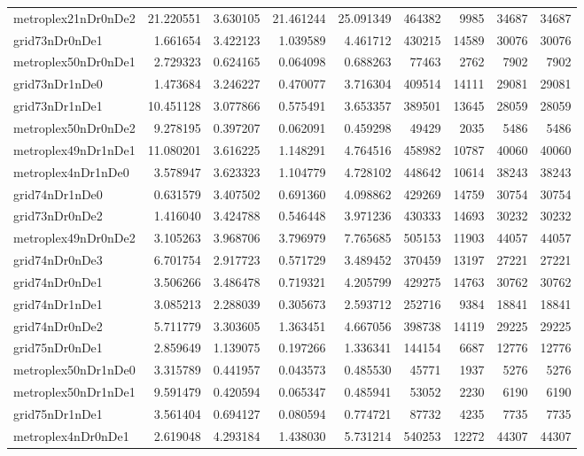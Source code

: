 \begin{longtable}{|l|r|r|r|r|r|r|r|r|}
metroplex21nDr0nDe2 & 21.220551 & 3.630105 & 21.461244 & 25.091349 & 464382 & 9985 & 34687 & 34687 \\
grid73nDr0nDe1 & 1.661654 & 3.422123 & 1.039589 & 4.461712 & 430215 & 14589 & 30076 & 30076 \\
metroplex50nDr0nDe1 & 2.729323 & 0.624165 & 0.064098 & 0.688263 & 77463 & 2762 & 7902 & 7902 \\
grid73nDr1nDe0 & 1.473684 & 3.246227 & 0.470077 & 3.716304 & 409514 & 14111 & 29081 & 29081 \\
grid73nDr1nDe1 & 10.451128 & 3.077866 & 0.575491 & 3.653357 & 389501 & 13645 & 28059 & 28059 \\
metroplex50nDr0nDe2 & 9.278195 & 0.397207 & 0.062091 & 0.459298 & 49429 & 2035 & 5486 & 5486 \\
metroplex49nDr1nDe1 & 11.080201 & 3.616225 & 1.148291 & 4.764516 & 458982 & 10787 & 40060 & 40060 \\
metroplex4nDr1nDe0 & 3.578947 & 3.623323 & 1.104779 & 4.728102 & 448642 & 10614 & 38243 & 38243 \\
grid74nDr1nDe0 & 0.631579 & 3.407502 & 0.691360 & 4.098862 & 429269 & 14759 & 30754 & 30754 \\
grid73nDr0nDe2 & 1.416040 & 3.424788 & 0.546448 & 3.971236 & 430333 & 14693 & 30232 & 30232 \\
metroplex49nDr0nDe2 & 3.105263 & 3.968706 & 3.796979 & 7.765685 & 505153 & 11903 & 44057 & 44057 \\
grid74nDr0nDe3 & 6.701754 & 2.917723 & 0.571729 & 3.489452 & 370459 & 13197 & 27221 & 27221 \\
grid74nDr0nDe1 & 3.506266 & 3.486478 & 0.719321 & 4.205799 & 429275 & 14763 & 30762 & 30762 \\
grid74nDr1nDe1 & 3.085213 & 2.288039 & 0.305673 & 2.593712 & 252716 & 9384 & 18841 & 18841 \\
grid74nDr0nDe2 & 5.711779 & 3.303605 & 1.363451 & 4.667056 & 398738 & 14119 & 29225 & 29225 \\
grid75nDr0nDe1 & 2.859649 & 1.139075 & 0.197266 & 1.336341 & 144154 & 6687 & 12776 & 12776 \\
metroplex50nDr1nDe0 & 3.315789 & 0.441957 & 0.043573 & 0.485530 & 45771 & 1937 & 5276 & 5276 \\
metroplex50nDr1nDe1 & 9.591479 & 0.420594 & 0.065347 & 0.485941 & 53052 & 2230 & 6190 & 6190 \\
grid75nDr1nDe1 & 3.561404 & 0.694127 & 0.080594 & 0.774721 & 87732 & 4235 & 7735 & 7735 \\
metroplex4nDr0nDe1 & 2.619048 & 4.293184 & 1.438030 & 5.731214 & 540253 & 12272 & 44307 & 44307 \\

\end{longtable}
